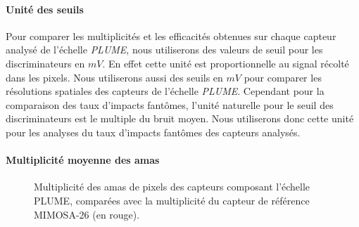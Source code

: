    \paragraph{Unit\'e des seuils}
   
   Pour comparer les multiplicit\'es et les efficacit\'es obtenues sur chaque capteur analys\'e de l'\'echelle \textit{PLUME}, nous utiliserons des valeurs de seuil pour les discriminateurs en $mV$. En effet cette unit\'e est proportionnelle au signal r\'ecolté dans les pixels. Nous utiliserons aussi des seuils en $mV$ pour comparer les r\'esolutions spatiales des capteurs de l'\'echelle \textit{PLUME}. Cependant pour la comparaison des taux d'impacts fant\^omes, l'unit\'e naturelle pour le seuil des discriminateurs est le multiple du bruit moyen. Nous utiliserons donc cette unit\'e pour les analyses du taux d'impacts fant\^omes des capteurs analys\'es.
   
   \paragraph{Multiplicit\'e moyenne des amas}
   
   
  \begin{figure}[htb!]
     \begin{center}
     \end{center}
     \caption{Multiplicit\'e des amas de pixels des capteurs composant l'\'echelle PLUME, compar\'ees avec la multiplicit\'e du capteur de r\'ef\'erence MIMOSA-26 (en rouge).}
     \label{fig:mult_PLUME}
   \end{figure}
   
